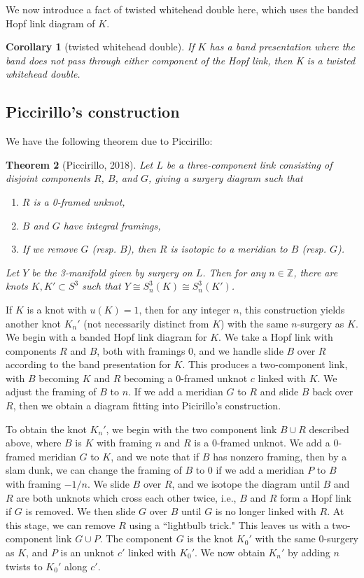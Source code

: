 \documentclass[11pt,usenames,dvipsnames,reqno]{amsart}
\newtheorem{theorem}{Theorem}
\numberwithin{theorem}{section}
\newtheorem{corollary}[theorem]{Corollary}
\theoremstyle{ex}
\theoremstyle{rem}
\begin{document}
We now introduce a fact of twisted whitehead double here, which uses the banded Hopf link diagram of $K$.

\begin{corollary} [twisted whitehead double]If $K$ has a band presentation where the band does not pass through either component of the Hopf link, then K is a twisted whitehead double.
\end{corollary}

\subsection{Piccirillo's construction} We have the following theorem due to Piccirillo:

\begin{theorem}[Piccirillo, 2018]
	Let $L$ be a three-component link consisting of disjoint components $R$, $B$, and $G$, giving a surgery diagram such that
	\begin{enumerate}
		\item $R$ is a 0-framed unknot,
		\item $B$ and $G$ have integral framings,
		\item If we remove $G$ (resp. $B$), then $R$ is isotopic to a meridian to $B$ (resp. $G$).
	\end{enumerate}
	Let $Y$ be the 3-manifold given by surgery on $L$. Then for any $n\in\mathbb{Z}$, there are knots $K,K'\subset S^3$ such that $Y\cong S_n^3(K)\cong S_n^3(K')$.

\end{theorem}

If $K$ is a knot with $u(K)=1$, then for any integer $n$, this construction yields another knot $K_n'$ (not necessarily distinct from $K$) with the same $n$-surgery as $K$. We begin with a banded Hopf link diagram for $K$. We take a Hopf link with components $R$ and $B$, both with framings 0, and we handle slide $B$ over $R$ according to the band presentation for $K$. This produces a two-component link, with $B$ becoming $K$ and $R$ becoming a 0-framed unknot $c$ linked with $K$. We adjust the framing of $B$ to $n$. If we add a meridian $G$ to $R$ and slide $B$ back over $R$, then we obtain a diagram fitting into Picirillo's construction.

To obtain the knot $K_n'$, we begin with the two component link $B\cup R$ described above, where $B$ is $K$ with framing $n$ and $R$ is a 0-framed unknot. We add a 0-framed meridian $G$ to $K$, and we note that if $B$ has nonzero framing, then by a slam dunk, we can change the framing of $B$ to 0 if we add a meridian $P$ to $B$ with framing $-1/n$. We slide $B$ over $R$, and we isotope the diagram until $B$ and $R$ are both unknots which cross each other twice, i.e., $B$ and $R$ form a Hopf link if $G$ is removed. We then slide $G$ over $B$ until $G$ is no longer linked with $R$. At this stage, we can remove $R$ using a ``lightbulb trick." This leaves us with a two-component link $G\cup P$. The component $G$ is the knot $K_0'$ with the same 0-surgery as $K$, and $P$ is an unknot $c'$ linked with $K_0'$. We now obtain $K_n'$ by adding $n$ twists to $K_0'$ along $c'$.
\end{document}
